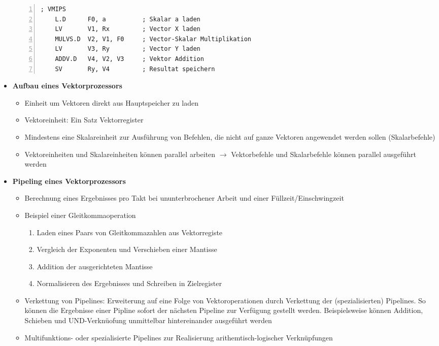 \begin{itemize}
\begin{minipage}{\linewidth}
\begin{lstlisting}[frame=single,numbers=left,mathescape,language={[mips]Assembler}]
; VMIPS
	L.D      F0, a       	; Skalar a laden
	LV       V1, Rx      	; Vector X laden
	MULVS.D  V2, V1, F0  	; Vector-Skalar Multiplikation
	LV       V3, Ry      	; Vector Y laden
	ADDV.D   V4, V2, V3  	; Vektor Addition
	SV       Ry, V4      	; Resultat speichern
	\end{lstlisting}
	\end{minipage}
	\item \textbf{Aufbau eines Vektorprozessors}
	\begin{itemize}
		\item Einheit um Vektoren direkt aus Hauptspeicher zu laden
		\item Vektoreinheit: Ein Satz Vektorregister
		\item Mindestens eine Skalareinheit zur Ausführung von Befehlen, die nicht auf ganze Vektoren angewendet werden sollen (Skalarbefehle)
		\item Vektoreinheiten und Skalareinheiten können parallel arbeiten \(\rightarrow\) Vektorbefehle und Skalarbefehle können parallel ausgeführt werden
	\end{itemize}
	\item \textbf{Pipeling eines Vektorprozessors}
	\begin{itemize}
		\item Berechnung eines Ergebnisses pro Takt bei ununterbrochener Arbeit und einer Füllzeit/Einschwingzeit
		\item Beispiel einer Gleitkommaoperation
		\begin{enumerate}
			\item Laden eines Paars von Gleitkommazahlen aus Vektorregiste
			\item Vergleich der Exponenten und Verschieben einer Mantisse
			\item Addition der ausgerichteten Mantisse
			\item Normalisieren des Ergebnisses und Schreiben in Zielregister
		\end{enumerate}
		\item Verkettung von Pipelines: Erweiterung auf eine Folge von Vektoroperationen durch Verkettung der (spezialisierten) Pipelines. So können die Ergebnisse einer Pipline sofort der nächsten Pipeline zur Verfügung gestellt werden. Beispielsweise können Addition, Schieben und UND-Verknüofung unmittelbar hintereinander ausgeführt werden
		\item Multifunktions- oder spezialisierte Pipelines zur Realisierung arithemtisch-logischer Verknüpfungen
		\begin{itemize}

\end{itemize}
\end{itemize}
\end{itemize}

